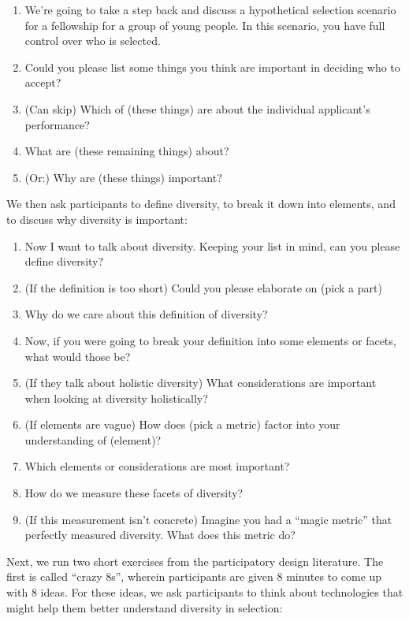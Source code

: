 \begin{enumerate}
    \item We're going to take a step back and discuss a hypothetical selection scenario for a fellowship for a group of young people. In this scenario, you have full control over who is selected.
    \item Could you please list some things you think are important in deciding who to accept?
    \item (Can skip) Which of (these things) are about the individual applicant's performance?
    \item What are (these remaining things) about? 
    \item (Or:) Why are (these things) important?
\end{enumerate}

We then ask participants to define diversity, to break it down into elements, and to discuss why diversity is important:

\begin{enumerate}
    \item Now I want to talk about diversity. Keeping your list in mind, can you please define diversity?
    \item (If the definition is too short) Could you please elaborate on (pick a part)
    \item Why do we care about this definition of diversity?
    \item Now, if you were going to break your definition into some elements or facets, what would those be?
    \item (If they talk about holistic diversity) What considerations are important when looking at diversity holistically?
    \item (If elements are vague) How does (pick a metric) factor into your understanding of (element)?
    \item Which elements or considerations are most important?
    \item How do we measure these facets of diversity?
    \item (If this measurement isn't concrete) Imagine you had a ``magic metric'' that perfectly measured diversity. What does this metric do?
\end{enumerate}

Next, we run two short exercises from the participatory design literature. The first is called ``crazy 8s'', wherein participants are given 8 minutes to come up with 8 ideas. For these ideas, we ask participants to think about technologies that might help them better understand diversity in selection:

